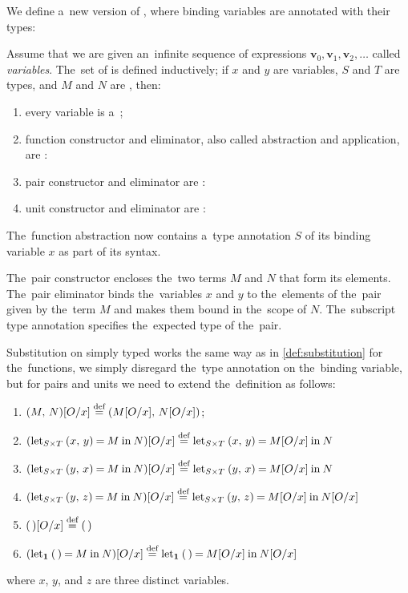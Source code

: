 We define a~new version of \lts, where binding variables are annotated with
their types:
\begin{definition}\label{def:stlc}
  Assume that we are given an~infinite sequence of expressions $\mathbf{v}_0,
  \mathbf{v}_1, \mathbf{v}_2, \dots$ called \emph{variables}. The~set of
  \emph{\lts} is defined inductively; if $x$ and $y$ are variables, $S$ and $T$
  are types, and $M$ and $N$ are \lts, then:
  \begin{enumerate}
    \item every variable is a~\lt;
    \item function constructor and eliminator, also called abstraction and
      application, are \lts:
    \item \label{def:stlc:let_item} pair constructor and eliminator are \lts:
    \item unit constructor and eliminator are \lts:
  \end{enumerate}
\end{definition}
The~function abstraction now contains a~type annotation $S$ of its binding
variable $x$ as part of its syntax.

The~pair constructor encloses the~two terms $M$ and $N$ that form its elements.
The~pair eliminator binds the~variables $x$ and $y$ to the~elements of the~pair
given by the~term $M$ and makes them bound in the~scope of $N$. The~subscript
type annotation specifies the~expected type of the~pair.

Substitution on simply typed \lts works the same way as in
\autoref{def:substitution} for the~functions, we simply disregard the~type
annotation on the~binding variable, but for pairs and units we need to extend
the~definition as follows:
\begin{enumerate}
  \setcounter{enumi}{\value{subst_enum}}
  \item $(M, \, N) [O/x] \overset{\textrm{def}}{=} (M[O/x], \, N[O/x])$;
  \item $(\letpair {S \times T} x y M N)[O/x] \defeq
    \letpair {S \times T} x y {M[O/x]} N$
  \item $(\letpair{S\times T} y x M N)[O/x] \defeq
    \letpair{S \times T} y x {M[O/x]} N$
  \item $(\letpair{S\times T} y z M N)[O/x] \defeq
    \letpair{S \times T} y z {M[O/x]} {N[O/x]}$
  \item $( \, )[O/x] \overset{\textrm{def}}{=} ( \, )$
  \item $(\letu M N)[O/x] \defeq \letu {M[O/x]} {N[O/x]}$
\end{enumerate}
where $x$, $y$, and $z$ are three distinct variables.

